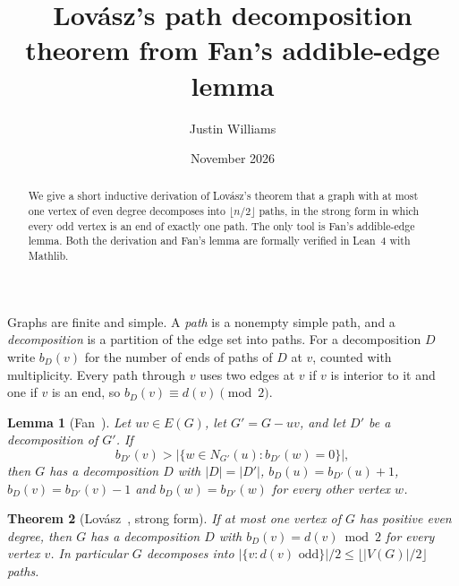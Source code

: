 \documentclass[11pt]{amsart}
\title{Lov\'asz's path decomposition theorem from Fan's addible-edge lemma}
\author{Justin Williams}
\date{November 2026}
\newtheorem{theorem}{Theorem}
\newtheorem{lemma}[theorem]{Lemma}
\theoremstyle{remark}
\begin{document}
\begin{abstract}
We give a short inductive derivation of Lov\'asz's theorem that a graph with at most one vertex of
even degree decomposes into $\lfloor n/2\rfloor$ paths, in the strong form in which every odd vertex is
an end of exactly one path. The only tool is Fan's addible-edge lemma. Both the derivation and Fan's
lemma are formally verified in Lean~4 with Mathlib.
\end{abstract}
\maketitle

Graphs are finite and simple. A \emph{path} is a nonempty simple path, and a \emph{decomposition} is a
partition of the edge set into paths. For a decomposition $D$ write $b_D(v)$ for the number of ends of
paths of $D$ at $v$, counted with multiplicity. Every path through $v$ uses two edges at $v$ if $v$ is
interior to it and one if $v$ is an end, so $b_D(v)\equiv d(v)\pmod 2$.

\begin{lemma}[Fan~{\cite[Lemma 3.4]{Fan}}]\label{lem:fan}
Let $uv\in E(G)$, let $G'=G-uv$, and let $D'$ be a decomposition of $G'$. If
\[
b_{D'}(v) > \bigl|\{w\in N_{G'}(u): b_{D'}(w)=0\}\bigr|,
\]
then $G$ has a decomposition $D$ with $|D|=|D'|$, $b_D(u)=b_{D'}(u)+1$, $b_D(v)=b_{D'}(v)-1$ and $b_D(w)=b_{D'}(w)$
for every other vertex $w$.
\end{lemma}

\begin{theorem}[Lov\'asz~\cite{L68}, strong form]\label{thm:lovasz}
If at most one vertex of $G$ has positive even degree, then $G$ has a decomposition $D$ with
$b_D(v)=d(v)\bmod 2$ for every vertex $v$. In particular $G$ decomposes into $|\{v:d(v)\text{ odd}\}|/2\le
\lfloor|V(G)|/2\rfloor$ paths.
\end{theorem}
\end{document}
